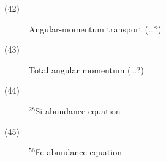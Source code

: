 \begin{description}
\item[(42)]  Angular-momentum transport (\ldots?)
\item[(43)]  Total angular momentum (\ldots?)
\item[(44)]  $^{28}$Si abundance equation
\item[(45)]  $^{56}$Fe abundance equation
\end{description}
